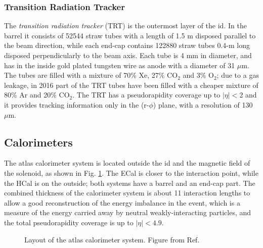 \subsubsection*{Transition Radiation Tracker}

The \textit{transition radiation tracker} (TRT) is the outermost layer of the \gls{id}. In the barrel it consists of 52544 straw tubes with a length of 1.5 m disposed parallel to the beam direction, while each end-cap contains 122880 straw tubes 0.4-m long disposed perpendicularly to the beam axis. Each tube is 4 mm in diameter, and has in the inside gold plated tungsten wire as anode with a diameter of 31 $\mu$m. The tubes are filled with a mixture of 70\% Xe, 27\% CO$_2$ and 3\% O$_2$; due to a gas leakage, in 2016 part of the TRT tubes have been filled with a cheaper mixture of 80\% Ar and 20\% CO$_2$. The TRT has a pseudorapidity coverage up to $|\eta|<$2 and it provides tracking information only in the (r-$\phi$) plane, with a resolution of 130 $\mu$m.


\subsection{Calorimeters}
\label{sec:atlas:calo}

The \gls{atlas} calorimeter system is located outside the \gls{id} and the magnetic field of the solenoid, as shown in Fig. \ref{fig:atlas:calo}. The ECal is closer to the interaction point, while the HCal is on the outside; both systems have a barrel and an end-cap part. 
The combined thickness of the calorimeter system is about 11 interaction lengths to allow a good reconstruction of the energy imbalance in the event, which is a measure of the energy carried away by neutral weakly-interacting particles, and the total pseudorapidity coverage is up to $|\eta|<4.9$. 

\begin{figure}[ht]
\centering
{}
\caption{Layout of the \gls{atlas} calorimeter system. Figure from Ref. \cite{atlas:atlas}}
\label{fig:atlas:calo}
\end{figure}

